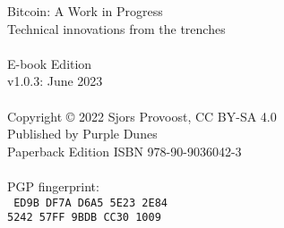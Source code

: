 \newpage
{\setlength{\parindent}{0cm}
\begin{vplace}
Bitcoin: A Work in Progress\\
Technical innovations from the trenches\\
\\
E-book Edition\\
v1.0.3: June 2023\\
\\
Copyright © 2022 Sjors Provoost, CC BY-SA 4.0\\
Published by Purple Dunes\\
Paperback Edition ISBN 978-90-9036042-3\\


\\

PGP fingerprint:\\
\texttt{
ED9B DF7A D6A5 5E23 2E84\\
5242 57FF 9BDB CC30 1009\\
}

\end{vplace}
}
